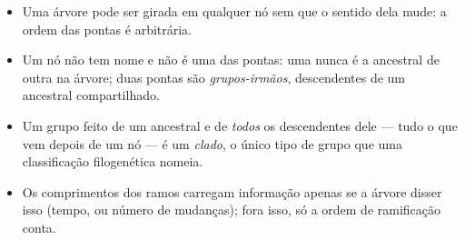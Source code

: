 \begin{proposition}\label{prop:g12:phylogenetic-trees:rules}
\begin{itemize}
  \item Uma árvore pode ser girada em qualquer nó sem que o sentido
        dela mude: a ordem das pontas é arbitrária.
  \item Um nó não tem nome e não é uma das pontas: uma  nunca é
        a ancestral de outra  na árvore; duas pontas são
        \emph{grupos-irmãos}, descendentes de um ancestral compartilhado.
  \item Um grupo feito de um ancestral e de \emph{todos} os
        descendentes dele --- tudo o que vem depois de um nó --- é um
        \emph{clado}, o único tipo de grupo que uma
        classificação filogenética nomeia.
  \item Os comprimentos dos ramos carregam informação apenas se a
        árvore disser isso (tempo, ou número de mudanças); fora isso,
        só a ordem de ramificação conta.
\end{itemize}
\end{proposition}
\admitted


